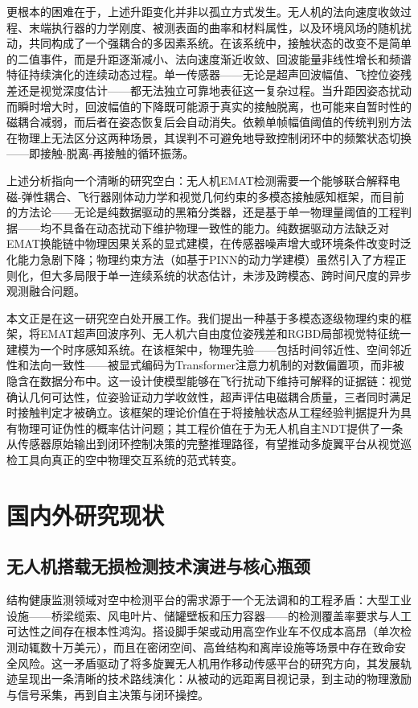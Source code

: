 更根本的困难在于，上述升距变化并非以孤立方式发生。无人机的法向速度收敛过程、末端执行器的力学刚度、被测表面的曲率和材料属性，以及环境风场的随机扰动，共同构成了一个强耦合的多因素系统。在该系统中，接触状态的改变不是简单的二值事件，而是升距逐渐减小、法向速度渐近收敛、回波能量非线性增长和频谱特征持续演化的连续动态过程。单一传感器——无论是超声回波幅值、飞控位姿残差还是视觉深度估计——都无法独立可靠地表征这一复杂过程。当升距因姿态扰动而瞬时增大时，回波幅值的下降既可能源于真实的接触脱离，也可能来自暂时性的磁耦合减弱，而后者在姿态恢复后会自动消失。依赖单帧幅值阈值的传统判别方法在物理上无法区分这两种场景，其误判不可避免地导致控制闭环中的频繁状态切换——即接触-脱离-再接触的循环振荡。

上述分析指向一个清晰的研究空白：无人机EMAT检测需要一个能够联合解释电磁-弹性耦合、飞行器刚体动力学和视觉几何约束的多模态接触感知框架，而目前的方法论——无论是纯数据驱动的黑箱分类器，还是基于单一物理量阈值的工程判据——均不具备在动态扰动下维护物理一致性的能力。纯数据驱动方法缺乏对EMAT换能链中物理因果关系的显式建模，在传感器噪声增大或环境条件改变时泛化能力急剧下降；物理约束方法（如基于PINN的动力学建模）虽然引入了方程正则化，但大多局限于单一连续系统的状态估计，未涉及跨模态、跨时间尺度的异步观测融合问题。

本文正是在这一研究空白处开展工作。我们提出一种基于多模态逐级物理约束的框架，将EMAT超声回波序列、无人机六自由度位姿残差和RGBD局部视觉特征统一建模为一个时序感知系统。在该框架中，物理先验——包括时间邻近性、空间邻近性和法向一致性——被显式编码为Transformer注意力机制的对数偏置项，而非被隐含在数据分布中。这一设计使模型能够在飞行扰动下维持可解释的证据链：视觉确认几何可达性，位姿验证动力学收敛性，超声评估电磁耦合质量，三者同时满足时接触判定才被确立。该框架的理论价值在于将接触状态从工程经验判据提升为具有物理可证伪性的概率估计问题；其工程价值在于为无人机自主NDT提供了一条从传感器原始输出到闭环控制决策的完整推理路径，有望推动多旋翼平台从视觉巡检工具向真正的空中物理交互系统的范式转变。

\section{国内外研究现状}

\subsection{无人机搭载无损检测技术演进与核心瓶颈}

结构健康监测领域对空中检测平台的需求源于一个无法调和的工程矛盾：大型工业设施——桥梁缆索、风电叶片、储罐壁板和压力容器——的检测覆盖率要求与人工可达性之间存在根本性鸿沟。搭设脚手架或动用高空作业车不仅成本高昂（单次检测动辄数十万美元），而且在密闭空间、高耸结构和离岸设施等场景中存在致命安全风险。这一矛盾驱动了将多旋翼无人机用作移动传感平台的研究方向，其发展轨迹呈现出一条清晰的技术路线演化：从被动的远距离目视记录，到主动的物理激励与信号采集，再到自主决策与闭环操控。

